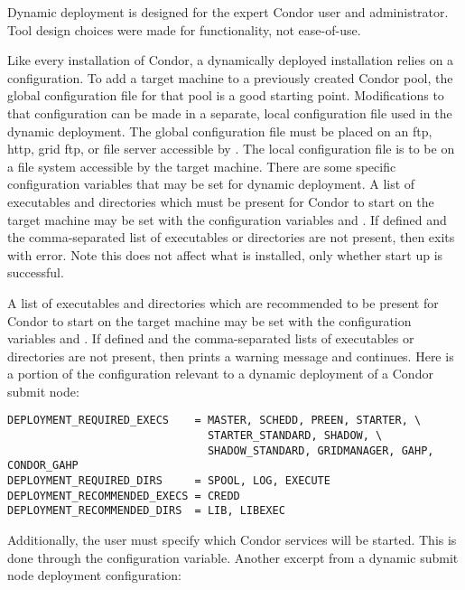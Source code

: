 Dynamic deployment is designed for the expert Condor user
and administrator.
Tool design choices were made for functionality,
not ease-of-use.

Like every installation of Condor, a dynamically deployed installation
relies on a configuration.
To add a target
machine to a previously created Condor pool,
the global configuration file for that pool is a good starting point.
Modifications to that configuration can be made in a separate, 
local configuration file used in the dynamic deployment.
The global configuration file must
be placed on an ftp, http, grid ftp, or file server 
accessible by .  The local configuration file
is to be on a file system accessible by the target machine.
There are some specific configuration variables that may be set for
dynamic deployment.  
A list of executables and directories which must be present
for Condor to start on the target machine may be set with
the configuration variables  and
. 
If defined and the comma-separated list of executables or directories are
not present, then  exits with error.
Note this does not affect what is installed, only
whether start up is successful. 

A list of executables and directories which are recommended to be present
for Condor to start on the target machine may be set with
the configuration variables  and
. 
If defined and the comma-separated lists of executables or directories are
not present, then  prints a warning message
and continues.
Here is a portion of the configuration relevant to
a dynamic deployment of a Condor submit node:

\footnotesize
\begin{verbatim}
DEPLOYMENT_REQUIRED_EXECS    = MASTER, SCHEDD, PREEN, STARTER, \
                               STARTER_STANDARD, SHADOW, \
                               SHADOW_STANDARD, GRIDMANAGER, GAHP, CONDOR_GAHP
DEPLOYMENT_REQUIRED_DIRS     = SPOOL, LOG, EXECUTE
DEPLOYMENT_RECOMMENDED_EXECS = CREDD
DEPLOYMENT_RECOMMENDED_DIRS  = LIB, LIBEXEC
\end{verbatim}
\normalsize

Additionally, the user must
specify which Condor services will be started.  This is done through
the \MacroNI{DAEMON\_LIST} configuration variable.  Another excerpt
from a dynamic submit node deployment configuration:

